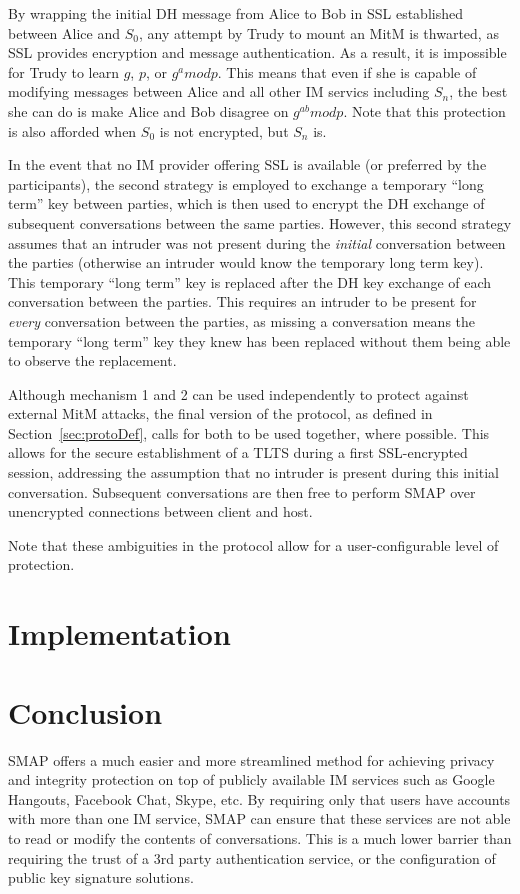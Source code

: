 \documentclass[twoside,10pt]{article}
\begin{document}
\begin{multicols}{2}
By wrapping the initial DH message from Alice to Bob in SSL established between Alice and $S_0$, any attempt by Trudy to mount an MitM is thwarted, as SSL provides encryption and message authentication.  As a result, it is impossible for Trudy to learn $g$, $p$, or $g^a mod p$.  This means that even if she is capable of modifying messages between Alice and all other IM servics including $S_n$, the best she can do is make Alice and Bob disagree on $g^{ab} mod p$.  Note that this protection is also afforded when $S_0$ is not encrypted, but $S_n$ is.

In the event that no IM provider offering SSL is available (or preferred by the participants), the second strategy is employed to exchange a temporary ``long term'' key between parties, which is then used to encrypt the DH exchange of subsequent conversations between the same parties.  However, this second strategy assumes that an intruder was not present during the \emph{initial} conversation between the parties (otherwise an intruder would know the temporary long term key).  This temporary ``long term'' key is replaced after the DH key exchange of each conversation between the parties.  This requires an intruder to be  present for \emph{every} conversation between the parties, as missing a conversation means the temporary ``long term'' key they knew has been replaced without them being able to observe the replacement.

Although mechanism 1 and 2 can be used independently to protect against external MitM attacks, the final version of the protocol, as defined in Section~\ref{sec:protoDef}, calls for both to be used together, where possible.  This allows for the secure establishment of a TLTS during a first SSL-encrypted session, addressing the assumption that no intruder is present during this initial conversation.  Subsequent conversations are then free to perform SMAP over unencrypted connections between client and host.

Note that these ambiguities in the protocol allow for a user-configurable level of protection.

\section{Implementation}

\section{Conclusion}
SMAP offers a much easier and more streamlined method for achieving privacy and integrity protection on top of publicly available IM services such as Google Hangouts, Facebook Chat, Skype, etc.  By requiring only that users have accounts with more than one IM service, SMAP can ensure that these services are not able to read or modify the contents of conversations.  This is a much lower barrier than requiring the trust of a 3rd party authentication service, or the configuration of public key signature solutions.


\end{multicols}
\end{document}

